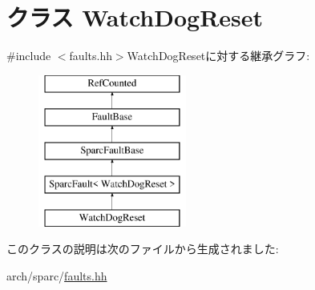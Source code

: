 \hypertarget{classSparcISA_1_1WatchDogReset}{
\section{クラス WatchDogReset}
\label{classSparcISA_1_1WatchDogReset}
}


{\ttfamily \#include $<$faults.hh$>$}WatchDogResetに対する継承グラフ:\begin{figure}[H]
\begin{center}
\leavevmode
\includegraphics[height=5cm]{classSparcISA_1_1WatchDogReset}
\end{center}
\end{figure}


このクラスの説明は次のファイルから生成されました:\begin{DoxyCompactItemize}
\item 
arch/sparc/\hyperlink{arch_2sparc_2faults_8hh}{faults.hh}\end{DoxyCompactItemize}
